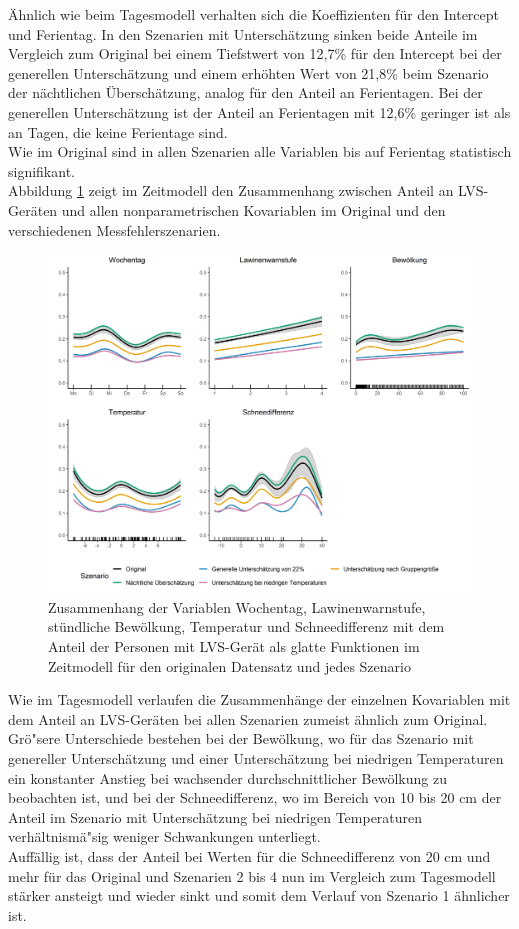 \documentclass[12pt]{scrreprt}
\begin{document}
\noindent Ähnlich wie beim Tagesmodell verhalten sich die Koeffizienten für den Intercept und Ferientag. In den Szenarien mit Unterschätzung sinken beide Anteile im Vergleich zum Original bei einem Tiefstwert von 12,7\% für den Intercept bei der generellen Unterschätzung und einem erhöhten Wert von 21,8\% beim Szenario der nächtlichen Überschätzung, analog für den Anteil an Ferientagen. Bei der generellen Unterschätzung ist der Anteil an Ferientagen mit 12,6\% geringer ist als an Tagen, die keine Ferientage sind. \\
Wie im Original sind in allen Szenarien alle Variablen bis auf Ferientag statistisch signifikant. \\
Abbildung \ref{pic:time_model_comparison} zeigt im Zeitmodell den Zusammenhang zwischen Anteil an LVS-Geräten und allen nonparametrischen Kovariablen im Original und den verschiedenen Messfehlerszenarien.
\begin{figure}[H]
	\centering
	\includegraphics[width=\linewidth]{plots/time_model_comparison}
	\caption{Zusammenhang der Variablen Wochentag, Lawinenwarnstufe, stündliche Bewölkung, Temperatur und Schneedifferenz mit dem Anteil der Personen mit LVS-Gerät als glatte Funktionen im Zeitmodell für den originalen Datensatz und jedes Szenario}
	\label{pic:time_model_comparison}	
\end{figure}
\noindent Wie im Tagesmodell verlaufen die Zusammenhänge der einzelnen Kovariablen mit dem Anteil an LVS-Geräten bei allen Szenarien zumeist ähnlich zum Original. Grö"sere Unterschiede bestehen bei der Bewölkung, wo für das Szenario mit genereller Unterschätzung und einer Unterschätzung bei niedrigen Temperaturen ein konstanter Anstieg bei wachsender durchschnittlicher Bewölkung zu beobachten ist, und bei der Schneedifferenz, wo im Bereich von 10 bis 20 cm der Anteil im Szenario mit Unterschätzung bei niedrigen Temperaturen verhältnismä"sig weniger Schwankungen unterliegt. \\
Auffällig ist, dass der Anteil bei Werten für die Schneedifferenz von 20 cm und mehr für das Original und Szenarien 2 bis 4 nun im Vergleich zum Tagesmodell stärker ansteigt und wieder sinkt und somit dem Verlauf von Szenario 1 ähnlicher ist.
\end{document}
